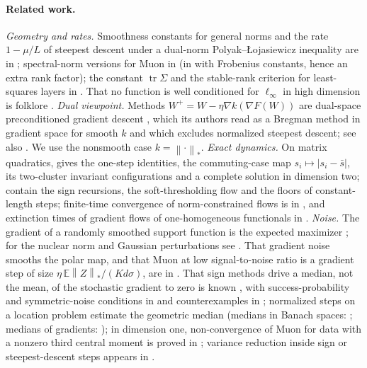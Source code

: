 \documentclass[11pt]{article}
\theoremstyle{remark}
\newcommand{\E}{\mathbb{E}}
\newcommand{\nnuc}[1]{\left\|#1\right\|_{*}}
\newcommand{\abs}[1]{\left|#1\right|}
\newcommand{\tr}{\operatorname{tr}}
\begin{document}
\paragraph{Related work.} \emph{Geometry and rates.} Smoothness constants for general norms and the rate $1-\mu/L$
of steepest descent under a dual-norm Polyak--\L{}ojasiewicz inequality are in \cite{balles2020geometry}; spectral-norm
versions for Muon in \cite{riabinin2025gluon,shen2025convergence,kovalev2025noneuclidean} (in
\cite{lau2025polargrad} with Frobenius constants, hence an extra rank factor); the constant
$\tr\Sigma$ and the stable-rank criterion for least-squares layers in \cite{davis2025spectral}. That no function is
well conditioned for $\ell_\infty$ in high dimension is folklore \cite{sidford2018coordinate}. \emph{Dual viewpoint.}
Methods $W^+=W-\eta\nabla k(\nabla F(W))$ are dual-space preconditioned gradient descent \cite{maddison2021dual}, which
its authors read as a Bregman method in gradient space for smooth $k$ and which excludes normalized steepest descent;
see also \cite{kim2023mirror,chen2024lion,chen2025muon,ghane2026dual}. We use the nonsmooth case $k=\nnuc\cdot$. \emph{Exact
dynamics.} On matrix quadratics, \cite{shulgin2026quadratic} gives the one-step identities, the commuting-case map
$s_i\mapsto\abs{s_i-\bar s}$, its two-cluster invariant configurations and a complete solution in dimension two;
\cite{vasudeva2025muon,gonon2026insights,ma2026preconditioning,wang2026why,jawanpuria2026constant} contain the sign
recursions, the soft-thresholding flow and the floors of constant-length steps; finite-time convergence of
norm-constrained flows is in \cite{leplat2025norm,cortes2006finite,ma2021qualitative}, and extinction times of gradient
flows of one-homogeneous functionals in \cite{bungert2021nonlinear}. \emph{Noise.} The gradient of a randomly smoothed
support function is the expected maximizer \cite{duchi2012randomized,abernethy2014online,duboistaine2022fast}; for the
nuclear norm and Gaussian perturbations see \cite{jiang2026adaptive}. That gradient noise smooths the polar map, and
that Muon at low signal-to-noise ratio is a gradient step of size $\eta\,\E\nnuc Z/(Kd\sigma)$, are in
\cite{xie2026muon,chen2026when,jacobs2026parallel,paquette2026phases}. That sign methods drive a median, not the mean,
of the stochastic gradient to zero is known \cite{chen2020distributed}, with success-probability and symmetric-noise
conditions in \cite{bernstein2018signsgd,bernstein2019majority,safaryan2021stochastic} and counterexamples in
\cite{karimireddy2019error}; normalized steps on a location problem estimate the geometric median
\cite{cardot2013efficient} (medians in Banach spaces: \cite{minsker2015geometric}; medians of gradients:
\cite{schaipp2025tracking}); in dimension one, non-convergence of Muon for data with a nonzero third central moment is
proved in \cite{do2026muon}; variance reduction inside sign or steepest-descent steps appears in
\cite{chzhen2023signsvrg,li2026implicit}.
\end{document}
